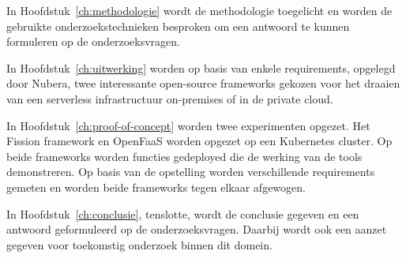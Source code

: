 In Hoofdstuk~\ref{ch:methodologie} wordt de methodologie toegelicht en worden de gebruikte onderzoekstechnieken besproken om een antwoord te kunnen formuleren op de onderzoeksvragen.

In Hoofdstuk~\ref{ch:uitwerking} worden op basis van enkele requirements, opgelegd door Nubera, twee interessante open-source frameworks gekozen voor het draaien van een serverless infrastructuur on-premises of in de private cloud.

In Hoofdstuk~\ref{ch:proof-of-concept} worden twee experimenten opgezet. Het Fission framework en OpenFaaS worden opgezet op een Kubernetes cluster. Op beide frameworks worden functies gedeployed die de werking van de tools demonstreren. Op basis van de opstelling worden verschillende requirements gemeten en worden beide frameworks tegen elkaar afgewogen.

In Hoofdstuk~\ref{ch:conclusie}, tenslotte, wordt de conclusie gegeven en een antwoord geformuleerd op de onderzoeksvragen. Daarbij wordt ook een aanzet gegeven voor toekomstig onderzoek binnen dit domein.


